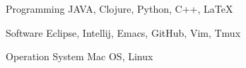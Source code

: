 

\begin{cvskills}

  \cvskill
    {Programming} %
    {JAVA, Clojure, Python, C++, LaTeX} %

  \cvskill
    {Software} %
    {Eclipse, Intellij, Emacs, GitHub, Vim, Tmux} %
    
  \cvskill
    {Operation System}
    {Mac OS, Linux}


\end{cvskills}
